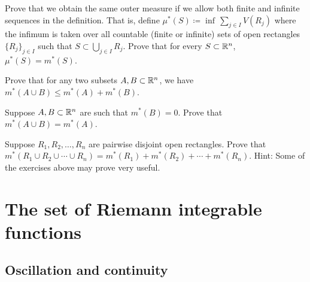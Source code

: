 \begin{exercise} \label{exercise:allowfiniteseqsinoutermeasure}
Prove that we obtain the same outer measure if we allow both finite and
infinite sequences in
the definition.  That is, define $\mu^*(S) \coloneqq \inf\, \sum_{j \in I} V(R_j)$
where the infimum is taken over all countable (finite or infinite) sets of
open rectangles $\{ R_j \}_{j\in I}$ such that $S \subset
\bigcup_{j \in I} R_j$.  Prove that for every $S \subset {\mathbb{R}}^n$,
$\mu^*(S) = m^*(S)$.
\end{exercise}

\begin{exercise}
Prove that for any two subsets $A, B \subset {\mathbb{R}}^n$, we have
$m^*(A \cup B) \leq m^*(A)+m^*(B)$.
\end{exercise}

\begin{exercise}
Suppose $A, B \subset {\mathbb{R}}^n$ are such that $m^*(B)=0$.  Prove that
$m^*(A \cup B) = m^*(A)$.
\end{exercise}

\begin{exercise}[Challenging] \label{exercise:outermeasureofsumofrectangles}
Suppose $R_1,R_2,\ldots,R_n$ are pairwise disjoint open rectangles.
Prove that 
$m^*(R_1 \cup R_2 \cup \cdots \cup R_n) = m^*(R_1)+m^*(R_2)+\cdots+m^*(R_n)$.
Hint: Some of the exercises above may prove very useful.
\end{exercise}



\sectionnewpage
\section{The set of Riemann integrable functions }
\label{sec:riemannlebesgue}



\subsection{Oscillation and continuity}

